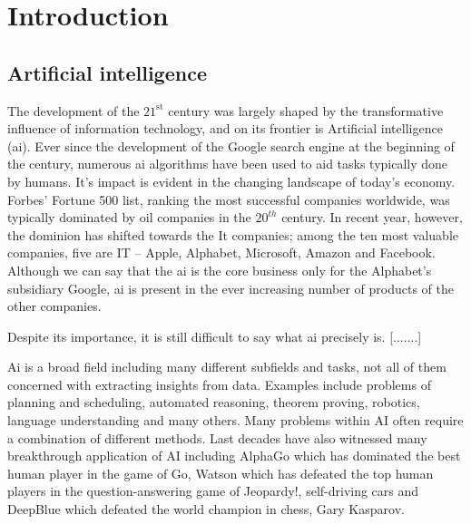 \chapter{Introduction}\label{ch:introduction}


\section{Artificial intelligence}


The development of the $21^{\text{st}}$ century was largely shaped by the transformative influence of information technology, and on its frontier is  Artificial intelligence (\gls{ai}).
Ever since the development of the Google search engine at the beginning of the century, numerous \gls{ai} algorithms have been used to aid tasks typically done by humans.
It's impact is evident in the changing landscape of today's economy.
Forbes' Fortune 500 list, ranking the most successful companies worldwide, was typically dominated by oil companies in the $20^{th}$ century.
In recent year, however, the dominion has shifted towards the It companies; among the ten most valuable companies, five are IT -- Apple, Alphabet, Microsoft, Amazon and Facebook.
Although we can say that the \gls{ai} is the core business only for the Alphabet's subsidiary Google, \gls{ai} is present in the ever increasing number of products of the other companies.







Despite its importance, it is still difficult to say what \gls{ai} precisely is. [.......]




Ai is a broad field including many different subfields and tasks, not all of them concerned with extracting insights from data.
Examples include problems of planning and scheduling, automated reasoning, theorem proving, robotics, language understanding and many others.
Many problems within AI often require a combination of different methods.
Last decades have also witnessed many breakthrough application of AI including AlphaGo \cite{SilverHuangEtAl16nature,silver2017mastering} which has dominated the best human player in the game of Go, Watson \cite{journals/aim/FerrucciBCFGKLMNPSW10} which has defeated the top human players in the question-answering game of Jeopardy!, self-driving cars and DeepBlue \cite{Hsu:2002:BDB:601291}  which defeated the world champion in chess, Gary Kasparov.





